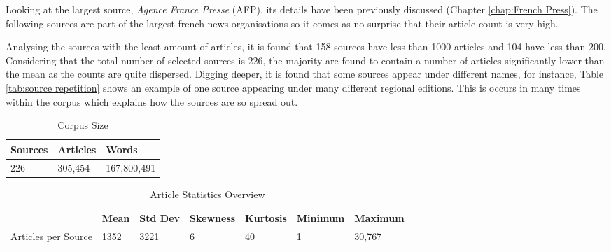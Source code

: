 Looking at the largest source, \emph{Agence France Presse} (AFP), its details have been previously discussed (Chapter \ref{chap:French Press}). The following sources are part of the largest french news organisations so it comes as no surprise that their article count is very high.

Analysing the sources with the least amount of articles, it is found that 158 sources have less than 1000 articles and 104 have less than 200. Considering that the total number of selected sources is 226, the majority are found to contain a number of articles significantly lower than the mean as the counts are quite dispersed. Digging deeper, it is found that some sources appear under different names, for instance, Table \ref{tab:source repetition} shows an example of one source appearing under many different regional editions. This is occurs in many times within the corpus which explains how the sources are so spread out. 

\begin{table}[]
\centering
\begin{tabular}{lll}
\toprule
Sources & Articles & Words \\ \hline
226 & 305,454 & 167,800,491 \\
\bottomrule
\end{tabular}
\caption{Corpus Size}
\label{tab: corpus size}
\end{table}

\begin{table}[]
\centering
\begin{tabular}{@{}lllllll@{}}
\toprule
 & Mean & Std Dev & Skewness & Kurtosis & Minimum & Maximum \\ \midrule
Articles per Source & 1352 & 3221 & 6 & 40 & 1 & 30,767 \\ \bottomrule
\end{tabular}
\caption{Article Statistics Overview}
\label{tab:core stat source}
\end{table}

